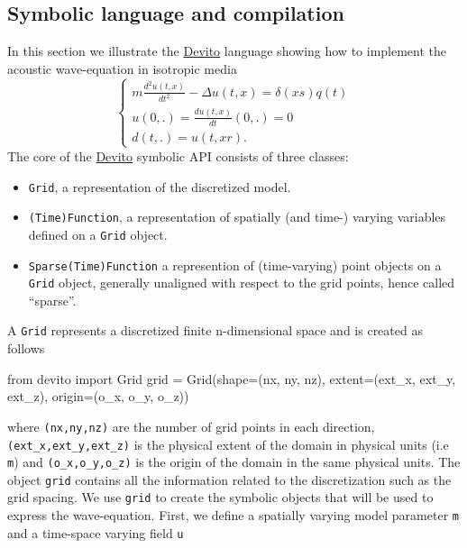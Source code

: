 \documentclass[conference]{IEEEtran}
\newenvironment{Shaded}{}{}
\newcommand{\CharTok}[1]{\textcolor[rgb]{0.25,0.44,0.63}{{#1}}}
\newcommand{\NormalTok}[1]{{#1}}
\begin{document}
\subsection{Symbolic language and
compilation}\label{symbolic-language-and-compilation}

In this section we illustrate the
\href{https://github.com/devitocodes/devito}{Devito} language showing
how to implement the acoustic wave-equation in isotropic media
%
\begin{equation}
\begin{cases}
 m \frac{d^2 u(t, x)}{dt^2} - \Delta u(t, x) = \delta(xs) q(t) \\
 u(0, .) = \frac{d u(t, x)}{dt}(0, .) = 0 \\
 d(t, .) = u(t, xr).
 \end{cases}
\label{acou}
\end{equation}
%
 The core of the \href{https://github.com/devitocodes/devito}{Devito}
symbolic API consists of three classes:

\begin{itemize}
\itemsep1pt\parskip0pt
\item
  \texttt{Grid}, a representation of the discretized model.
\item
  \texttt{(Time)Function}, a representation of spatially (and time-)
  varying variables defined on a \texttt{Grid} object.
\item
  \texttt{Sparse(Time)Function} a represention of (time-varying) point
  objects on a \texttt{Grid} object, generally unaligned with respect to
  the grid points, hence called ``sparse''.
\end{itemize}

A \texttt{Grid} represents a discretized finite n-dimensional space and
is created as follows

\begin{Shaded}
\begin{Highlighting}[]
\CharTok{from} \NormalTok{devito }\CharTok{import} \NormalTok{Grid}
\NormalTok{grid = Grid(shape=(nx, ny, nz), extent=(ext_x, ext_y, ext_z), origin=(o_x, o_y, o_z))}
\end{Highlighting}
\end{Shaded}

where \texttt{(nx,\phantom{\ }ny,\phantom{\ }nz)} are the number of grid
points in each direction,
\texttt{(ext\_x,\phantom{\ }ext\_y,\phantom{\ }ext\_z)} is the physical
extent of the domain in physical units (i.e \texttt{m}) and
\texttt{(o\_x,\phantom{\ }o\_y,\phantom{\ }o\_z)} is the origin of the
domain in the same physical units. The object \texttt{grid} contains all
the information related to the discretization such as the grid spacing.
We use \texttt{grid} to create the symbolic objects that will be used to
express the wave-equation. First, we define a spatially varying model
parameter \texttt{m} and a time-space varying field \texttt{u}
\end{document}
